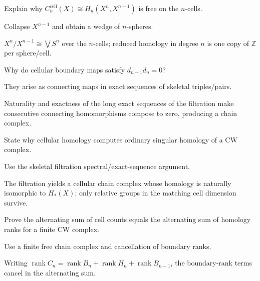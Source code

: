 \begin{exercise}\label{exr:viii18-ped-06}
Explain why $C_n^{\mathrm{cell}}(X)\cong H_n(X^n,X^{n-1})$ is free on the $n$-cells.
\end{exercise}
\begin{hint}
Collapse $X^{n-1}$ and obtain a wedge of $n$-spheres.
\end{hint}
\begin{solution}
$X^n/X^{n-1}\cong\bigvee S^n$ over the $n$-cells; reduced homology in degree $n$ is one copy of $\mathbb Z$ per sphere/cell.
\end{solution}

\begin{exercise}[$d^2=0$]\label{exr:viii18-ped-07}
Why do cellular boundary maps satisfy $d_{n-1}d_n=0$?
\end{exercise}
\begin{hint}
They arise as connecting maps in exact sequences of skeletal triples/pairs.
\end{hint}
\begin{solution}
Naturality and exactness of the long exact sequences of the filtration make consecutive connecting homomorphisms compose to zero, producing a chain complex.
\end{solution}

\begin{exercise}\label{exr:viii18-ped-08}
State why cellular homology computes ordinary singular homology of a CW complex.
\end{exercise}
\begin{hint}
Use the skeletal filtration spectral/exact-sequence argument.
\end{hint}
\begin{solution}
The filtration yields a cellular chain complex whose homology is naturally isomorphic to $H_*(X)$; only relative groups in the matching cell dimension survive.
\end{solution}

\begin{exercise}\label{exr:viii18-ped-09}
Prove the alternating sum of cell counts equals the alternating sum of homology ranks for a finite CW complex.
\end{exercise}
\begin{hint}
Use a finite free chain complex and cancellation of boundary ranks.
\end{hint}
\begin{solution}
Writing $\operatorname{rank}C_n=\operatorname{rank}B_n+\operatorname{rank}H_n+\operatorname{rank}B_{n-1}$, the boundary-rank terms cancel in the alternating sum.
\end{solution}

